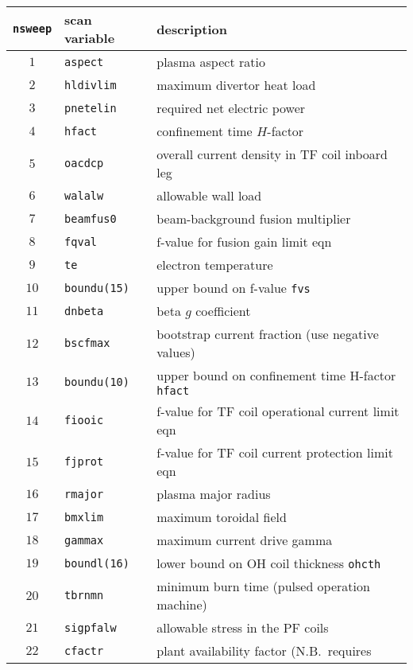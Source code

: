 \documentclass[11pt,a4paper]{report}
\begin{document}
\begin{table}[tbph]
\begin{center}

\begin{tabular}{||c|l|l||} \hline
\texttt{nsweep} & scan variable & description \\ \hline
$1 $ & \texttt{aspect}     & plasma aspect ratio \\
$2 $ & \texttt{hldivlim}   & maximum divertor heat load \\
$3 $ & \texttt{pnetelin}   & required net electric power \\
$4 $ & \texttt{hfact}      & confinement time $H$-factor \\
$5 $ & \texttt{oacdcp}     & overall current density in TF coil inboard leg \\
$6 $ & \texttt{walalw}     & allowable wall load \\
$7 $ & \texttt{beamfus0}   & beam-background fusion multiplier \\
$8 $ & \texttt{fqval}      & f-value for fusion gain limit eqn \\
$9 $ & \texttt{te}         & electron temperature \\
$10$ & \texttt{boundu(15)} & upper bound on f-value \texttt{fvs} \\
$11$ & \texttt{dnbeta}     & beta $g$ coefficient \\
$12$ & \texttt{bscfmax}    & bootstrap current fraction (use negative values) \\
$13$ & \texttt{boundu(10)} & upper bound on confinement time H-factor \texttt{hfact}\\
$14$ & \texttt{fiooic}     & f-value for TF coil operational current limit eqn \\
$15$ & \texttt{fjprot}     & f-value for TF coil current protection limit eqn \\
$16$ & \texttt{rmajor}     & plasma major radius \\
$17$ & \texttt{bmxlim}     & maximum toroidal field \\
$18$ & \texttt{gammax}     & maximum current drive gamma \\
$19$ & \texttt{boundl(16)} & lower bound on OH coil thickness \texttt{ohcth} \\
$20$ & \texttt{tbrnmn}     & minimum burn time (pulsed operation machine) \\
$21$ & \texttt{sigpfalw}   & allowable stress in the PF coils \\
$22$ & \texttt{cfactr}     & plant availability factor (N.B.\ requires

\end{tabular}
\end{center}
\end{table}
\end{document}
